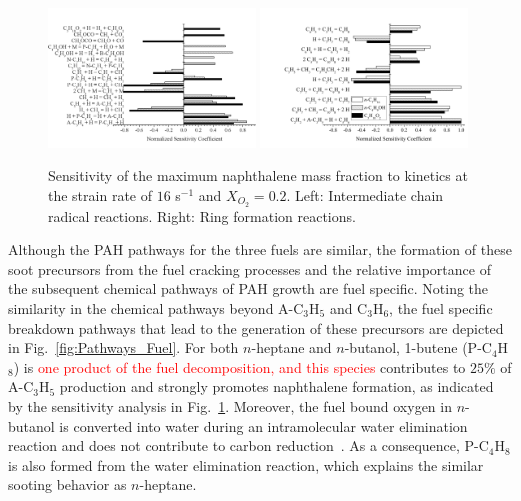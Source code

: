 \documentclass[review,3p,times]{elsarticleUS}
\begin{document}
\begin{figure}[t]
  \centering
  \scriptsize
  \includegraphics[trim=0mm 0mm 0mm 8mm, clip=true,width=0.49\textwidth]{Chain.png}
  \includegraphics[trim=0mm 0mm 0mm 8mm, clip=true,width=0.49\textwidth]{Ring.png}
  \normalsize
  \vspace{-0.2in}
  \caption{Sensitivity of the maximum naphthalene mass fraction to kinetics at the strain rate of $16$ s$^{-1}$ and $X_{O_2}=0.2$. Left: Intermediate chain radical reactions. Right: Ring formation reactions.}
  \label{fig:SA4}
\end{figure}

Although the PAH pathways for the three fuels are similar, the formation of these soot precursors from the fuel cracking processes and the relative importance of the subsequent chemical pathways of PAH growth are fuel specific. Noting the similarity in the chemical pathways beyond A-C$_3$H$_5$ and C$_3$H$_6$, the fuel specific breakdown pathways that lead to the generation of these precursors are depicted in Fig.~\ref{fig:Pathways_Fuel}. For both $n$-heptane and $n$-butanol, 1-butene (P-C$_4$H$_8$) is \textcolor{red}{one product of the fuel decomposition, and this species} contributes to $25\%$ of A-C$_3$H$_5$ production and strongly promotes naphthalene formation, as indicated by the sensitivity analysis in Fig.~\ref{fig:SA4}. Moreover, the fuel bound oxygen in $n$-butanol is converted into water during an intramolecular water elimination reaction and does not contribute to carbon reduction~\cite{mcenally05,mcenally11}.  As a consequence, P-C$_4$H$_8$ is also formed from the water elimination reaction, which explains the similar sooting behavior as $n$-heptane.
\end{document}
